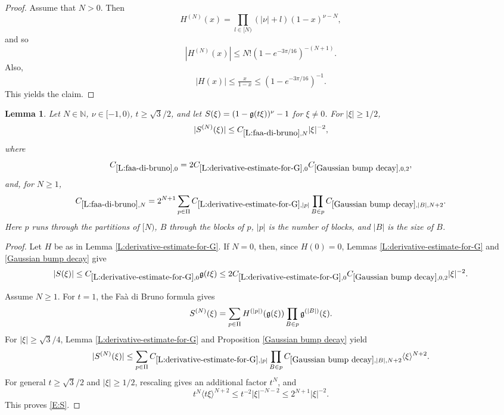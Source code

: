 \documentclass[12pt,reqno]{amsart}
\theoremstyle{plain}
\newtheorem{lemma}[theorem]{Lemma}
\numberwithin{equation}{section}
\theoremstyle{remark}
\newcommand{\uses}[1]{}
\newcommand{\usesdefs}[1]{}
\newcommand{\N}{{\mathbb N}}
\begin{document}
\begin{proof}
Assume that $N >0$. Then
\[
H^{(N)}(x)=\prod_{l\in [N)} (|\nu|+l)(1-x)^{\nu-N},
\]
and so
\[
|H^{(N)}(x)| \leq N! \left(1 - e^{-3\pi/16}\right)^{-(N+1)}.
\]
Also,
\[
|H(x)| \leq \tfrac{x}{1-x} \leq \left(1 - e^{-3\pi/16}\right)^{-1}.
\]
This yields the claim.
\end{proof}


\begin{lemma}\label{L:faa-di-bruno}\uses{L:derivative-estimate-for-G,Gaussian bump decay}\usesdefs{gaussian,bracket bump}
Let $N\in\N$, $\nu\in[-1,0)$, $t\ge\sqrt3/2$, and let $S(\xi)=(1-\mathfrak{g}(t\xi))^\nu-1$ for $\xi\ne0$. For $|\xi|\ge1/2$,
\begin{equation}\label{E:S}
|S^{(N)}(\xi)|\le C_{\ref{L:faa-di-bruno},N}|\xi|^{-2},
\end{equation}
where
\begin{equation}\label{auto:Faa-di-Bruno-zero-constant}
C_{\ref{L:faa-di-bruno},0}
=2C_{\ref{L:derivative-estimate-for-G},0}C_{\ref{Gaussian bump decay},0,2},
\end{equation}
and, for $N\ge1$,
\begin{equation}\label{auto:Faa-di-Bruno-positive-constant}
C_{\ref{L:faa-di-bruno},N}
=2^{N+1}\sum_{p\in\Pi}C_{\ref{L:derivative-estimate-for-G},|p|}
\prod_{B\in p}C_{\ref{Gaussian bump decay},|B|,N+2}.
\end{equation}
Here $p$ runs through the partitions of $[N)$, $B$ through the blocks of $p$, $|p|$ is the number of blocks, and $|B|$ is the size of $B$.
\end{lemma}
\begin{proof}
Let $H$ be as in Lemma \ref{L:derivative-estimate-for-G}. If $N=0$, then, since $H(0)=0$, Lemmas \ref{L:derivative-estimate-for-G} and \ref{Gaussian bump decay} give
\[
|S(\xi)|
\le C_{\ref{L:derivative-estimate-for-G},0}\mathfrak{g}(t\xi)
\le2C_{\ref{L:derivative-estimate-for-G},0}C_{\ref{Gaussian bump decay},0,2}|\xi|^{-2}.
\]

Assume $N\ge1$. For $t=1$, the Fa\`a di Bruno formula gives
\[
S^{(N)}(\xi)
=
\sum_{p\in\Pi}H^{(|p|)}(\mathfrak{g}(\xi))
\prod_{B\in p}\mathfrak{g}^{(|B|)}(\xi).
\]
For $|\xi|\ge\sqrt3/4$, Lemma \ref{L:derivative-estimate-for-G} and Proposition \ref{Gaussian bump decay} yield
\[
|S^{(N)}(\xi)|
\le
\sum_{p\in\Pi}C_{\ref{L:derivative-estimate-for-G},|p|}
\prod_{B\in p}C_{\ref{Gaussian bump decay},|B|,N+2}
\langle\xi\rangle^{N+2}.
\]
For general $t\ge\sqrt3/2$ and $|\xi|\ge1/2$, rescaling gives an additional factor $t^N$, and
\[
t^N\langle t\xi\rangle^{N+2}
\le t^{-2}|\xi|^{-N-2}
\le2^{N+1}|\xi|^{-2}.
\]
This proves \eqref{E:S}.
\end{proof}
\end{document}
